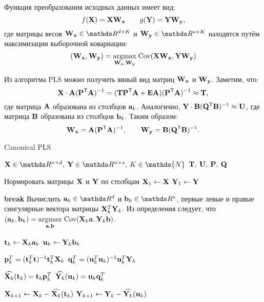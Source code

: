 \documentclass[a4paper, 12pt]{article}
\begin{document}
Функция преобразования исходных данных имеет вид: 
$$ f(\mathbf{X}) = \mathbf{X}\mathbf{W}_{\mathbf{x}} \qquad g(\mathbf{Y}) = \mathbf{Y}\mathbf{W}_{\mathbf{y}}, $$ 
где матрицы весов $\bW_{\bx} \in \dR^{d \times K}$ и $\bW_{\by} \in \dR^{s \times K}$ находятся путём максимизации выборочной ковариации:
$$ (\mathbf{W}_{\mathbf{x}}, \mathbf{W}_{\mathbf{y}}) = \underset{\mathbf{W}_{\mathbf{x}}, \mathbf{W}_{\mathbf{y}}}{\text{argmax}}\; \text{Cov}(\mathbf{X}\mathbf{W}_{\mathbf{x}}, \mathbf{Y}\mathbf{W}_{\mathbf{y}})$$

Из алгоритма PLS можно получить явный вид матриц $\mathbf{W}_{\mathbf{x}}$ и $\mathbf{W}_{\mathbf{y}}$. Заметим, что:
$$ \mathbf{X} \cdot \mathbf{A}(\mathbf{P} ^{\mathsf{T}} \mathbf{A})^{-1} = (\mathbf{T} \mathbf{P} ^{\mathsf{T}} \mathbf{A} + \mathbf{E} \mathbf{A})(\mathbf{P} ^{\mathsf{T}} \mathbf{A})^{-1} \approx \mathbf{T}, $$
где матрица $\mathbf{A}$ образована из столбцов $\mathbf{a}_k$. Аналогично, $\mathbf{Y} \cdot \mathbf{B}(\mathbf{Q} ^{\mathsf{T}} \mathbf{B})^{-1} \approx \mathbf{U}$, где матрица $\mathbf{B}$ образована из столбцов $\mathbf{b}_k$. 
Таким образом:
$$ \mathbf{W}_{\mathbf{x}} = \mathbf{A}(\mathbf{P} ^{\mathsf{T}} \mathbf{A})^{-1}, \qquad \mathbf{W}_{\mathbf{y}} = \mathbf{B}(\mathbf{Q} ^{\mathsf{T}} \mathbf{B})^{-1}. $$

\begin{algorithm}[bhtp]
	\caption{Canonical PLS}\label{alg:pls}
	\begin{algorithmic}
		\Require $\bX \in \dR^{n \times d}, \: \bY \in \dR^{n \times s}, \: K \in \mathds{N}$
		\Ensure $\mathbf{T}, \: \mathbf{U}, \: \mathbf{P}, \: \mathbf{Q}$
		
		\State Нормировать матрицы $\mathbf{X}$ и $\mathbf{Y}$ по столбцам
		\State $\mathbf{X}_1 \gets \mathbf{X}$
		\State $\mathbf{Y}_1 \gets \mathbf{Y}$

				\State \textbf{break}
			\EndIf
			\State Вычислить $\ba_k \in \dR^d$ и $\bb_k \in \dR^s$, первые
			\State левые и правые сингулярные вектора матрицы $\mathbf{X}_k^T \mathbf{Y}_k$.
			\State Из определения следует, что $(\mathbf{a}_k, \mathbf{b}_k) = \underset{\mathbf{a}, \mathbf{b}}{\text{argmax}} \text{ Cov} (\mathbf{X}_k \mathbf{a}, \mathbf{Y}_k \mathbf{b})$.
			
			\State $\mathbf{t}_k \gets \mathbf{X}_k \mathbf{a}_k$
			\State $\mathbf{u}_k \gets \mathbf{Y}_k \mathbf{b}_k$
			
			\State $\mathbf{p}_k^T = (\mathbf{t}_k^T \mathbf{t})^{-1} \mathbf{t}_k^T \mathbf{X}_k$
			\State $\mathbf{q}_k^T = (\mathbf{u}_k^T \mathbf{u}_k)^{-1} \mathbf{u}_k^T \mathbf{Y}_k$
			
			\State $\widehat{\mathbf{X}_k}(\mathbf{t}_k) = \mathbf{t}_k \mathbf{p}_k^T$
			\State $\widehat{\mathbf{Y}_k}(\mathbf{u}_k) = \mathbf{u}_k \mathbf{q}_k^T$
			
			\State $\mathbf{X}_{k+1} \gets \mathbf{X}_k - \widehat{\mathbf{X}_k}(\mathbf{t}_k)$
			\State $\mathbf{Y}_{k+1} \gets \mathbf{Y}_k - \widehat{\mathbf{Y}_k}(\mathbf{u}_k)$
		\EndFor
	\end{algorithmic}
\end{algorithm}
\end{document}
